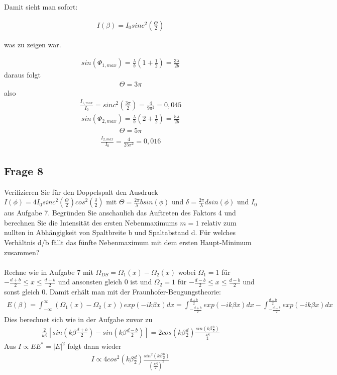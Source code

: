 \documentclass[a4paper,10pt]{scrartcl}
\begin{document}
Damit sieht man sofort: 

\begin{align*}
I(\beta)=I_{0}sinc^{2}(\frac{\Theta}{2})
\end{align*}

was zu zeigen war.

\begin{align*}
sin(\Phi_{1,max})=\frac{\lambda}{b}(1+\frac{1}{2})=\frac{3\lambda}{2b}
\end{align*}
daraus folgt 
\begin{align*}
\Theta=3\pi
\end{align*}
also
\begin{align*}
\frac{I_{1,max}}{I_{0}}=sinc^{2}(\frac{3\pi}{2})=\frac{4}{9\pi^{2}}=0,045
\end{align*}
\begin{align*}
sin(\Phi_{2,max})=\frac{\lambda}{b}(2+\frac{1}{2})=\frac{5\lambda}{2b}
\end{align*}
\begin{align*}
\Theta=5\pi
\end{align*}
\begin{align*}
\frac{I_{2,max}}{I_{0}}=\frac{4}{25\pi^{2}}=0,016
\end{align*}

\subsection{Frage 8}
Verifizieren Sie für den Doppelspalt den Ausdruck\(I(\phi)=4I_{0}sinc^{2}(\frac{\Theta}{2})cos^{2}(\frac{\delta}{2})\) mit \(\Theta=\frac{2\pi}{\lambda}bsin(\phi)\) und \(\delta=\frac{2\pi}{\lambda}dsin(\phi)\) und \(I_{0}\) aus Aufgabe 7. Begründen Sie anschaulich das Auftreten des Faktors 4 und berechnen Sie die Intensität des
ersten Nebenmaximums \(m=1\) relativ zum nullten in Abhängigkeit von Spaltbreite b und
Spaltabstand d. Für welches Verhältnis d/b fällt das fünfte Nebenmaximum mit dem ersten
Haupt-Minimum zusammen?\\
\\
Rechne wie in Aufgabe 7 mit \(\Omega_{DS}=\Omega_{1}(x)-\Omega_{2}(x)\) wobei \(\Omega_{1}=1\) für \(-\frac{d+b}{2}\leq x\leq \frac{d+b}{2}\) und ansonsten gleich 0 ist und \(\Omega_{2}=1\) für \(-\frac{d-b}{2}\leq x \leq \frac{d-b}{2}\) und sonst gleich 0. Damit erhält man mit der Fraunhofer-Beugungstheorie:
\begin{align*}
E(\beta)=\int_{-\infty}^{\infty}(\Omega_{1}(x)-\Omega_{2}(x))exp(-ik\beta x)dx=\int_{-\frac{d+b}{2}}^{\frac{d+b}{2}}exp(-ik\beta x)dx-\int_{-\frac{d-b}{2}}^{\frac{d-b}{2}}exp(-ik\beta x)dx
\end{align*}
Dies berechnet sich wie in der Aufgabe zuvor zu
\begin{align*}
\frac{2}{k\beta}[sin(k\beta\frac{d+b}{2})-sin(k\beta \frac{d-b}{2})]=2cos(k\beta \frac{d}{2})\frac{sin(k\beta\frac{b}{2})}{\frac{k\beta}{2}}
\end{align*}
Aus \(I\propto EE^{*}=|E|^{2}\) folgt dann wieder
\begin{align*}
I\propto 4cos^{2}(k\beta \frac{d}{2})\frac{sin^{2}(k\beta\frac{b}{2})}{(\frac{k\beta}{2})^{2}}
\end{align*}
\end{document}

